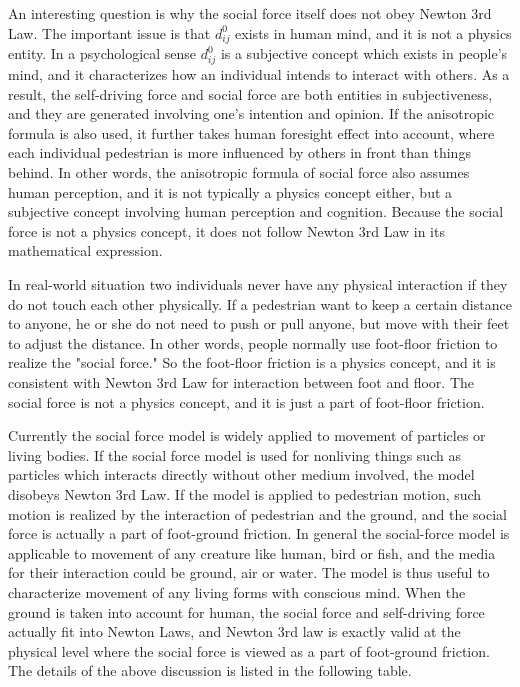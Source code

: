 \documentclass{article}
\begin{document}
An interesting question is why the social force itself does not obey Newton 3rd Law.  The important issue is that $d_{ij}^0$ exists in human mind, and it is not a physics entity.  In a psychological sense $d_{ij}^0$ is a subjective concept which exists in people's mind, and it characterizes how an individual intends to interact with others.  As a result, the self-driving force and social force are both entities in subjectiveness, and they are generated involving one's intention and opinion.  If the anisotropic formula is also used, it further takes human foresight effect into account, where each individual pedestrian is more influenced by others in front than things behind.  In other words, the anisotropic formula of social force also assumes human perception, and it is not typically a physics concept either, but a subjective concept involving human perception and cognition.  Because the social force is not a physics concept, it does not follow Newton 3rd Law in its mathematical expression.

In real-world situation two individuals never have any physical interaction if they do not touch each other physically.  If a pedestrian want to keep a certain distance to anyone, he or she do not need to push or pull anyone, but move with their feet to adjust the distance.  In other words, people normally use foot-floor friction to realize the "social force."  So the foot-floor friction is a physics concept, and it is consistent with Newton 3rd Law for interaction between foot and floor.  The social force is not a physics concept, and it is just a part of foot-floor friction.

Currently the social force model is widely applied to movement of particles or living bodies.  If the social force model is used for nonliving things such as particles which interacts directly without other medium involved, the model disobeys Newton 3rd Law.  If the model is applied to pedestrian motion, such motion is realized by the interaction of pedestrian and the ground, and the social force is actually a part of foot-ground friction.  In general the social-force model is applicable to movement of any creature like human, bird or fish, and the media for their interaction could be ground, air or water.  The model is thus useful to characterize movement of any living forms with conscious mind.  When the ground is taken into account for human, the social force and self-driving force actually fit into Newton Laws, and Newton 3rd law is exactly valid at the physical level where the social force is viewed as a part of foot-ground friction.  The details of the above discussion is listed in the following table.
\end{document}
